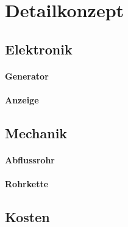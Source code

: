 \section{Detailkonzept} \label{sec:detailkonzept}

\subsection{Elektronik}

\paragraph{Generator}

\paragraph{Anzeige}

\subsection{Mechanik}

\paragraph{Abflussrohr}

\paragraph{Rohrkette}


\subsection{Kosten}